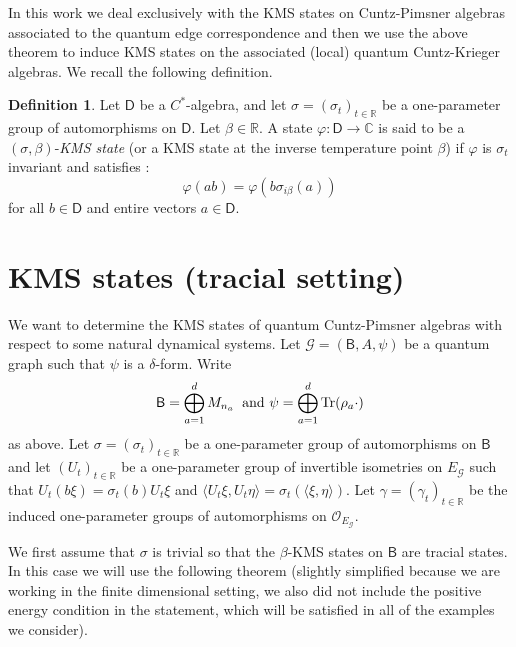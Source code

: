 \documentclass[a4paper,reqno]{amsart}
\numberwithin{equation}{section}
\numberwithin{theorem}{section}
\theoremstyle{definition}\newtheorem{definition}[theorem]{Definition}
\theoremstyle{definition}\newtheorem{remark}[theorem]{Remark}
\theoremstyle{definition}\newtheorem{example}[theorem]{Example}
\theoremstyle{definition}\newtheorem*{notation*}{Notation}
\theoremstyle{definition}\newtheorem*{convention*}{Convention}
\theoremstyle{definition}\newtheorem{observation}{Observation}
\theoremstyle{definition}\newtheorem*{acknowledgment*}{Acknowledgments}
\newcommand{\R}{\mathbb{R}}
\newcommand{\C}{\mathbb{C}}
\newcommand{\B}{\mathsf{B}}
\newcommand{\G}{\mathcal{G}}
\newcommand{\cst}{C^*}
\begin{document}
In this work we deal exclusively with the KMS states on Cuntz-Pimsner algebras associated to the quantum edge correspondence and then we use the above theorem to induce KMS states on the associated (local) quantum Cuntz-Krieger algebras. We recall the following definition.

\begin{definition}
    Let $\mathsf{D}$ be a $\cst$-algebra, and let $\sigma=(\sigma_t)_{t\in\R}$ be a one-parameter group of automorphisms on $\mathsf{D}$. Let $\beta\in\R$. A state $\varphi:\mathsf{D}\to\C$ is said to be a $(\sigma,\beta)$-{\em KMS state} (or a KMS state at the inverse temperature point $\beta$) if $\varphi$ is $\sigma_t$ invariant and satisfies :
    \[\varphi(ab)=\varphi(b\sigma_{i\beta}(a))\]
    for all $b\in \mathsf{D}$ and entire vectors $a\in \mathsf{D}$. 
\end{definition}





\section{KMS states (tracial setting)}

We want to determine the KMS states of quantum Cuntz-Pimsner algebras with respect to some natural dynamical systems.
Let $\G=(\B, A, \psi)$ be a quantum graph such that $\psi$ is a $\delta$-form. Write
\[\B=\bigoplus_{a=1}^dM_{n_a}\;\;\mbox{and }\psi=\bigoplus_{a=1}^d\Tr(\rho_a\cdot)\]
as above. Let $\sigma=(\sigma_t)_{t\in \R}$ be a one-parameter group of automorphisms on $\B$ and let $(U_t)_{t\in \R}$ be a one-parameter group of invertible isometries on $E_\G$ such that $U_t(b\xi)=\sigma_t(b)U_t\xi$ and $\langle U_t\xi, U_t\eta\rangle=\sigma_t(\langle\xi,\eta\rangle)$. Let $\gamma=(\gamma_t)_{t\in\R}$ be the induced one-parameter groups of automorphisms on $\mathcal{O}_{E_\G}$.

We first assume that $\sigma$ is trivial so that the $\beta$-KMS states on $\B$ are tracial states. In this case we will use the following theorem (slightly simplified because we are working in the finite dimensional setting, we also did not include the positive energy condition in the statement, which will be satisfied in all of the examples we consider).
\end{document}
